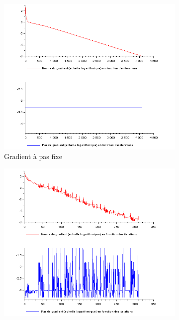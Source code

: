 \documentclass{article}
\begin{document}
    
    \begin{figure}
        \begin{subfigure}[t]{0.4\textwidth}
            \includegraphics[width=\textwidth]{../Images/Pas_fixe.png}
            \caption{Gradient à pas fixe}
            \label{fig:pas_fixe}
        \end{subfigure}
        \hfill
        \begin{subfigure}[t]{.4\textwidth}
            \includegraphics[width=\textwidth]{../Images/Pas_variable.png}

\end{subfigure}
\end{figure}
\end{document}
